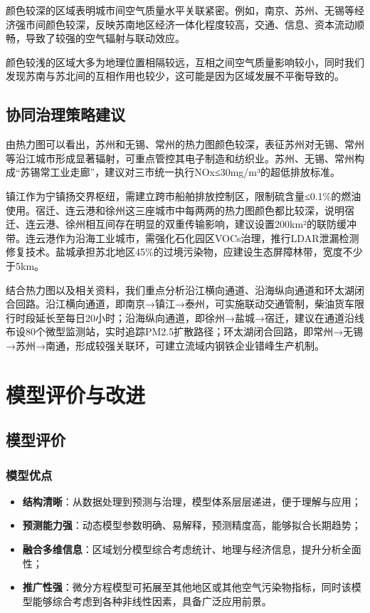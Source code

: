 \documentclass[a4paper,12pt]{article}
\begin{document}
	颜色较深的区域表明城市间空气质量水平关联紧密。例如，南京、苏州、无锡等经济强市间颜色较深，反映苏南地区经济一体化程度较高，交通、信息、资本流动顺畅，导致了较强的空气辐射与联动效应。
	
	颜色较浅的区域大多为地理位置相隔较远，互相之间空气质量影响较小，同时我们发现苏南与苏北间的互相作用也较少，这可能是因为区域发展不平衡导致的。
	
	\subsection{协同治理策略建议}
	
	由热力图可以看出，苏州和无锡、常州的热力图颜色较深，表征苏州对无锡、常州等沿江城市形成显著辐射，可重点管控其电子制造和纺织业。苏州、无锡、常州构成“苏锡常工业走廊”，建议对三市统一执行NOx≤30mg/m³的超低排放标准。
	
	镇江作为宁镇扬交界枢纽，需建立跨市船舶排放控制区，限制硫含量≤0.1\%的燃油使用。宿迁、连云港和徐州这三座城市中每两两的热力图颜色都比较深，说明宿迁、连云港、徐州相互间存在明显的双重传输影响，建议设置200km²的联防缓冲带。连云港作为沿海工业城市，需强化石化园区VOCs治理，推行LDAR泄漏检测修复技术。盐城承担苏北地区45\%的过境污染物，应建设生态屏障林带，宽度不少于5km。
	
	结合热力图以及相关资料，我们重点分析沿江横向通道、沿海纵向通道和环太湖闭合回路。沿江横向通道，即南京→镇江→泰州，可实施联动交通管制，柴油货车限行时段延长至每日20小时；沿海纵向通道，即徐州→盐城→宿迁，建议在通道沿线布设80个微型监测站，实时追踪PM2.5扩散路径；环太湖闭合回路，即常州→无锡→苏州→南通，形成较强关联环，可建立流域内钢铁企业错峰生产机制。
	\section{模型评价与改进}
	
	\subsection{模型评价}
	\subsubsection{模型优点}
	
	\begin{itemize}
		\item \textbf{结构清晰}：从数据处理到预测与治理，模型体系层层递进，便于理解与应用；
		\item \textbf{预测能力强}：动态模型参数明确、易解释，预测精度高，能够拟合长期趋势；
		\item \textbf{融合多维信息}：区域划分模型综合考虑统计、地理与经济信息，提升分析全面性；
		\item\textbf{推广性强}：微分方程模型可拓展至其他地区或其他空气污染物指标，同时该模型能够综合考虑到各种非线性因素，具备广泛应用前景。
	\end{itemize}
	
\end{document}
